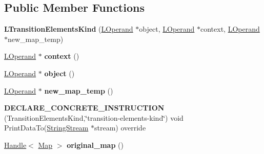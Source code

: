 \subsection*{Public Member Functions}
\begin{DoxyCompactItemize}
\item 
{\bfseries L\+Transition\+Elements\+Kind} (\hyperlink{classv8_1_1internal_1_1_l_operand}{L\+Operand} $\ast$object, \hyperlink{classv8_1_1internal_1_1_l_operand}{L\+Operand} $\ast$context, \hyperlink{classv8_1_1internal_1_1_l_operand}{L\+Operand} $\ast$new\+\_\+map\+\_\+temp)\hypertarget{classv8_1_1internal_1_1_l_transition_elements_kind_a6a44fc06b9c2f761c817997ec00269f3}{}\label{classv8_1_1internal_1_1_l_transition_elements_kind_a6a44fc06b9c2f761c817997ec00269f3}

\item 
\hyperlink{classv8_1_1internal_1_1_l_operand}{L\+Operand} $\ast$ {\bfseries context} ()\hypertarget{classv8_1_1internal_1_1_l_transition_elements_kind_aad280c0f1cf8e5ca120cf21b05bd93f0}{}\label{classv8_1_1internal_1_1_l_transition_elements_kind_aad280c0f1cf8e5ca120cf21b05bd93f0}

\item 
\hyperlink{classv8_1_1internal_1_1_l_operand}{L\+Operand} $\ast$ {\bfseries object} ()\hypertarget{classv8_1_1internal_1_1_l_transition_elements_kind_a0257a511e1579fbc39001caf5b0ca855}{}\label{classv8_1_1internal_1_1_l_transition_elements_kind_a0257a511e1579fbc39001caf5b0ca855}

\item 
\hyperlink{classv8_1_1internal_1_1_l_operand}{L\+Operand} $\ast$ {\bfseries new\+\_\+map\+\_\+temp} ()\hypertarget{classv8_1_1internal_1_1_l_transition_elements_kind_a4a446ffbd6e39017d357109db06dd661}{}\label{classv8_1_1internal_1_1_l_transition_elements_kind_a4a446ffbd6e39017d357109db06dd661}

\item 
{\bfseries D\+E\+C\+L\+A\+R\+E\+\_\+\+C\+O\+N\+C\+R\+E\+T\+E\+\_\+\+I\+N\+S\+T\+R\+U\+C\+T\+I\+ON} (Transition\+Elements\+Kind,\char`\"{}transition-\/elements-\/kind\char`\"{}) void Print\+Data\+To(\hyperlink{classv8_1_1internal_1_1_string_stream}{String\+Stream} $\ast$stream) override\hypertarget{classv8_1_1internal_1_1_l_transition_elements_kind_ac3d3fcdb1323fb5a8ffe1c35ad9d633e}{}\label{classv8_1_1internal_1_1_l_transition_elements_kind_ac3d3fcdb1323fb5a8ffe1c35ad9d633e}

\item 
\hyperlink{classv8_1_1internal_1_1_handle}{Handle}$<$ \hyperlink{classv8_1_1internal_1_1_map}{Map} $>$ {\bfseries original\+\_\+map} ()\hypertarget{classv8_1_1internal_1_1_l_transition_elements_kind_a1f6534ac0fae8a2a00aacbdb977df2e1}{}\label{classv8_1_1internal_1_1_l_transition_elements_kind_a1f6534ac0fae8a2a00aacbdb977df2e1}


\end{DoxyCompactItemize}
